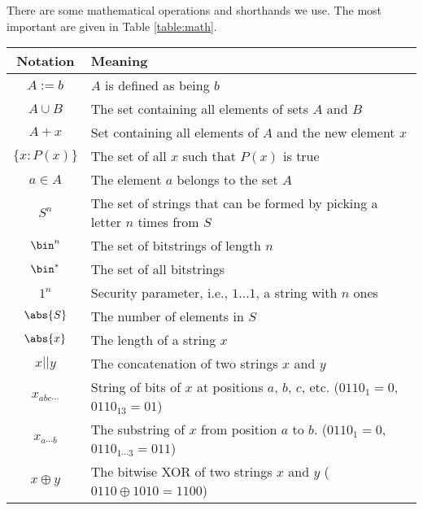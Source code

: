 There are some mathematical operations and shorthands we use. The most important are given in Table \ref{table:math}.
\begin{table}
  \begin{tabular}{c | l}
    Notation         & Meaning                                                                                \\ \hline
    $A := b$         & $A$ is defined as being $b$                                                            \\
    $A \cup B$       & The set containing all elements of sets $A$ and $B$                                    \\
    $A + x$          & Set containing all elements of $A$ and the new element $x$                             \\
    $\{x : P(x)\}$   & The set of all $x$ such that $P(x)$ is true                                            \\
    $a \in A$        & The element $a$ belongs to the set $A$                                                 \\
    $S^n$            & The set of strings that can be formed by picking a letter $n$ times from $S$           \\
    $\bin^n$         & The set of bitstrings of length $n$                                                    \\
    $\bin^*$         & The set of all bitstrings                                                              \\
    $1^n$            & Security parameter, i.e., $1...1$, a string with $n$ ones                              \\
    $\abs{S}$        & The number of elements in $S$                                                          \\
    $\abs{x}$        & The length of a string $x$                                                             \\
    $x||y$           & The concatenation of two strings $x$ and $y$                                           \\
    $x_{abc\cdots}$  & String of bits of $x$ at positions $a$, $b$, $c$, etc. ($0110_1 = 0$, $0110_{13}=01$)  \\
    $x_{a \cdots b}$ & The substring of $x$ from position $a$ to $b$. ($0110_1 = 0$, $0110_{1 \cdots 3}=011$) \\
    $x\oplus y$      & The bitwise XOR of two strings $x$ and $y$ ($0110 \oplus 1010 = 1100$)                 \\

\end{tabular}
\end{table}
